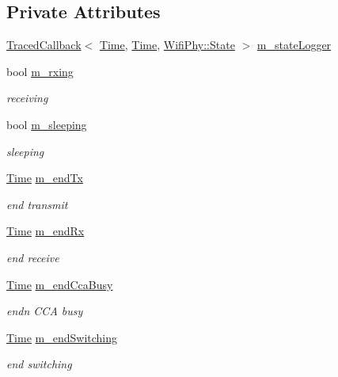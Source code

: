 \subsection*{Private Attributes}
\begin{DoxyCompactItemize}
\item 
\hyperlink{classns3_1_1TracedCallback}{Traced\+Callback}$<$ \hyperlink{classns3_1_1Time}{Time}, \hyperlink{classns3_1_1Time}{Time}, \hyperlink{classns3_1_1WifiPhy_af97408fa76f99797497b492758467143}{Wifi\+Phy\+::\+State} $>$ \hyperlink{classns3_1_1WifiPhyStateHelper_a5a88d96547b35744255e922440ff525d}{m\+\_\+state\+Logger}
\item 
bool \hyperlink{classns3_1_1WifiPhyStateHelper_af128b8f5f3d17a3c791b3e45a7ef7efd}{m\+\_\+rxing}
\begin{DoxyCompactList}\small\item\em receiving \end{DoxyCompactList}\item 
bool \hyperlink{classns3_1_1WifiPhyStateHelper_ad2de713d57e8a1c73fb1b74bf5e9883e}{m\+\_\+sleeping}
\begin{DoxyCompactList}\small\item\em sleeping \end{DoxyCompactList}\item 
\hyperlink{classns3_1_1Time}{Time} \hyperlink{classns3_1_1WifiPhyStateHelper_a13ecb79063b8ce5a333935f2ce774514}{m\+\_\+end\+Tx}
\begin{DoxyCompactList}\small\item\em end transmit \end{DoxyCompactList}\item 
\hyperlink{classns3_1_1Time}{Time} \hyperlink{classns3_1_1WifiPhyStateHelper_a65215c2866c06105a59c384c46e2687e}{m\+\_\+end\+Rx}
\begin{DoxyCompactList}\small\item\em end receive \end{DoxyCompactList}\item 
\hyperlink{classns3_1_1Time}{Time} \hyperlink{classns3_1_1WifiPhyStateHelper_a2e498aec307ea128a75ad8427a405979}{m\+\_\+end\+Cca\+Busy}
\begin{DoxyCompactList}\small\item\em endn C\+CA busy \end{DoxyCompactList}\item 
\hyperlink{classns3_1_1Time}{Time} \hyperlink{classns3_1_1WifiPhyStateHelper_a6e77cf95b8c598bab6a3d3d5e5c951b5}{m\+\_\+end\+Switching}
\begin{DoxyCompactList}\small\item\em end switching \end{DoxyCompactList}\item 

\end{DoxyCompactItemize}
